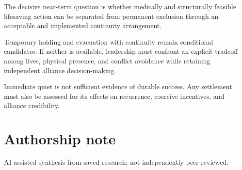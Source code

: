 \documentclass[11pt]{article}
\begin{document}
The decisive near-term question is whether medically and structurally feasible lifesaving action can be separated from permanent exclusion through an acceptable and implemented continuity arrangement.

Temporary holding and evacuation with continuity remain conditional candidates. If neither is available, leadership must confront an explicit tradeoff among lives, physical presence, and conflict avoidance while retaining independent alliance decision-making.

Immediate quiet is not sufficient evidence of durable success. Any settlement must also be assessed for its effects on recurrence, coercive incentives, and alliance credibility.

\section*{Authorship note}
AI-assisted synthesis from saved research; not independently peer reviewed.
\end{document}
